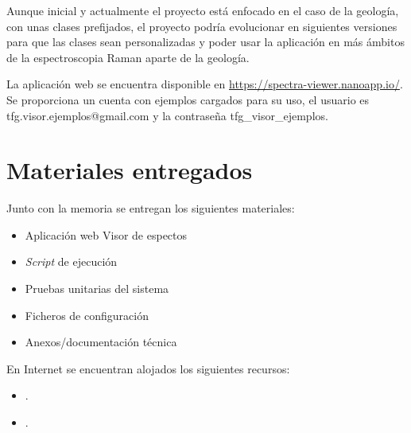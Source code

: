 Aunque inicial y actualmente el proyecto está enfocado en el caso de la
geología, con unas clases prefijados, el proyecto podría evolucionar en
siguientes versiones para que las clases sean personalizadas y poder usar la
aplicación en más ámbitos de la espectroscopia Raman aparte de la geología.

La aplicación web se encuentra disponible en \url{https://spectra-viewer.nanoapp.io/}. 
Se proporciona un cuenta con ejemplos cargados para su uso, el usuario es
tfg.visor.ejemplos@gmail.com y la contraseña tfg\_visor\_ejemplos.

\section{Materiales entregados}

Junto con la memoria se entregan los siguientes materiales:
\begin{itemize}
	\tightlist	
	\item Aplicación web Visor de espectos
	\item \textit{Script} de ejecución
	\item Pruebas unitarias del sistema
	\item Ficheros de configuración
	\item Anexos/documentación técnica
\end{itemize}
En Internet se encuentran alojados los siguientes recursos:
\begin{itemize}
	\tightlist	
	\item {}.
	\item {}.
\end{itemize}
